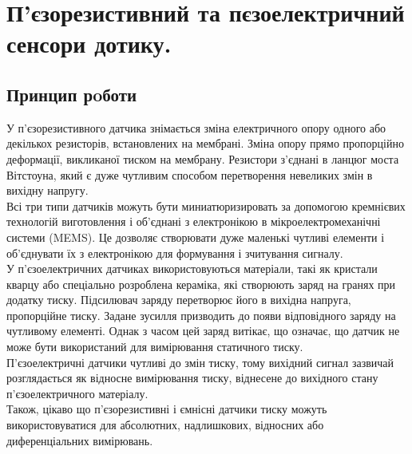 \documentclass[a4paper,fontsize=12]{report}
\begin{document}
\chapter{П'єзорезистивний та пєзоелектричний сенсори дотику.}
\section{Принцип рoботи}
  У п'єзорезистивного датчика знімається зміна електричного опору одного або декількох резисторів, встановлених на мембрані.
  Зміна опору прямо пропорційно деформації, викликаної тиском на мембрану. Резистори з'єднані в ланцюг моста Вітстоуна, який є дуже чутливим способом перетворення невеликих змін в вихідну напругу. \\

  Всі три типи датчиків можуть бути миниатюризировать за допомогою кремнієвих технологій виготовлення і об'єднані з електронікою в мікроелектромеханічні системи (MEMS). Це дозволяє створювати дуже маленькі чутливі елементи і об'єднувати їх з електронікою для формування і зчитування сигналу. \\

  У п'єзоелектричних датчиках використовуються матеріали, такі як кристали кварцу або спеціально розроблена кераміка, які створюють заряд на гранях при додатку тиску. Підсилювач заряду перетворює його в вихідна напруга, пропорційне тиску. Задане зусилля призводить до появи відповідного заряду на чутливому елементі. Однак з часом цей заряд витікає, що означає, що датчик не може бути використаний для вимірювання статичного тиску.\\

  П'єзоелектричні датчики чутливі до змін тиску, тому вихідний сигнал зазвичай розглядається як відносне вимірювання тиску, віднесене до вихідного стану п'єзоелектричного матеріалу.\\

  Також, цікаво що п'єзорезистивні і ємнісні датчики тиску можуть використовуватися для абсолютних, надлишкових, відносних або диференціальних вимірювань. \\
\end{document}
